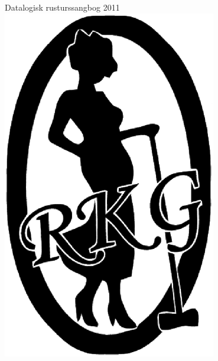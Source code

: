 \pagestyle{empty}
\begin{center}
  {\LARGE Datalogisk rusturssangbog 2011}\\
  \includegraphics[width=0.7\textwidth]{logo.eps}
\end{center}

\newpage
\pagestyle{headings}